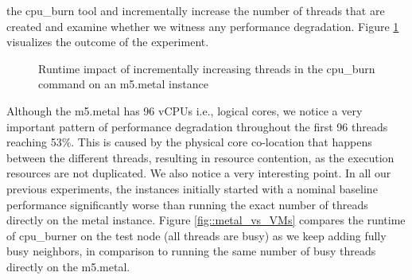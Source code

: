 the cpu\_burn tool and incrementally increase the number of threads that are created and examine
whether we witness any performance degradation. Figure \ref{fig::m5_metal} visualizes the outcome 
of the experiment. 
\begin{figure}[H]
\centering
{}
\caption{Runtime impact of incrementally increasing threads in the cpu\_burn command on an m5.metal instance} 
\label{fig::m5_metal}
\end{figure}
\noindent
Although the m5.metal has 96 vCPUs i.e., logical cores, we 
notice a very important pattern of performance degradation throughout the first 96 threads reaching 53\%. 
This is caused by the physical core co-location that happens between the different 
threads, resulting in resource contention, as the execution resources are not duplicated. 
We also notice a very interesting point. In all our previous experiments, the instances 
initially started with a nominal baseline performance significantly worse than running the 
exact number of threads directly on the metal instance. Figure \ref{fig::metal_vs_VMs} compares 
the runtime of cpu\_burner on the test node (all threads are busy) as we keep adding fully busy 
neighbors, in comparison to running the same number of busy threads directly on the m5.metal. 
